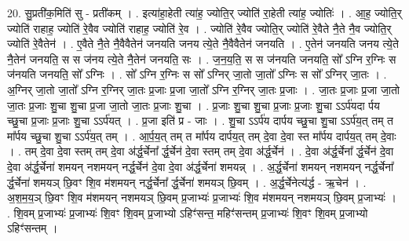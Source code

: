 \documentclass[17pt]{extarticle}
\begin{document}
20. सु॒प्रती॑क॒मिति॑ सु - प्रती॑कम् । . इत्या॑हा॒हेती त्या॑ह॒ ज्योति॒र् ज्योति॑ रा॒हेती त्या॑ह॒ ज्योतिः॑ । . आ॒ह॒ ज्योति॒र् ज्योति॑ राहाह॒ ज्योति॑ रे॒वैव ज्योति॑ राहाह॒ ज्योति॑ रे॒व । . ज्योति॑ रे॒वैव ज्योति॒र् ज्योति॑ रे॒वैते नै॒ते नै॒व ज्योति॒र् ज्योति॑ रे॒वैतेन॑ । . ए॒वैते नै॒ते नै॒वैवैतेन॑ जनयति जनय त्ये॒ते नै॒वैवैतेन॑ जनयति । . ए॒तेन॑ जनयति जनय त्ये॒ते नै॒तेन॑ जनयति॒ स स ज॑नय त्ये॒ते नै॒तेन॑ जनयति॒ सः । . ज॒न॒य॒ति॒ स स ज॑नयति जनयति॒ सो᳚ ऽग्नि र॒ग्निः स ज॑नयति जनयति॒ सो᳚ ऽग्निः । . सो᳚ ऽग्नि र॒ग्निः स सो᳚ ऽग्निर् जा॒तो जा॒तो᳚ ऽग्निः स सो᳚ ऽग्निर् जा॒तः । . अ॒ग्निर् जा॒तो जा॒तो᳚ ऽग्नि र॒ग्निर् जा॒तः प्र॒जाः प्र॒जा जा॒तो᳚ ऽग्नि र॒ग्निर् जा॒तः प्र॒जाः । . जा॒तः प्र॒जाः प्र॒जा जा॒तो जा॒तः प्र॒जाः शु॒चा शु॒चा प्र॒जा जा॒तो जा॒तः प्र॒जाः शु॒चा । . प्र॒जाः शु॒चा शु॒चा प्र॒जाः प्र॒जाः शु॒चा ऽऽर्प॑यदा र्पय च्छु॒चा प्र॒जाः प्र॒जाः शु॒चा ऽऽर्प॑यत् । . प्र॒जा इति॑ प्र - जाः । . शु॒चा ऽऽर्प॑य दार्पय च्छु॒चा शु॒चा ऽऽर्प॑य॒त् तम् त मा᳚र्पय च्छु॒चा शु॒चा ऽऽर्प॑य॒त् तम् । . आ॒र्प॒य॒त् तम् त मा᳚र्पय दार्पय॒त् तम् दे॒वा दे॒वा स्त मा᳚र्पय दार्पय॒त् तम् दे॒वाः । . तम् दे॒वा दे॒वा स्तम् तम् दे॒वा अ॑र्द्ध॒र्चेना᳚ र्द्ध॒र्चेन॑ दे॒वा स्तम् तम् दे॒वा अ॑र्द्ध॒र्चेन॑ । . दे॒वा अ॑र्द्ध॒र्चेना᳚ र्द्ध॒र्चेन॑ दे॒वा दे॒वा अ॑र्द्ध॒र्चेना॑ शमयन् नशमयन् नर्द्ध॒र्चेन॑ दे॒वा दे॒वा अ॑र्द्ध॒र्चेना॑ शमयन्न् । . अ॒र्द्ध॒र्चेना॑ शमयन् नशमयन् नर्द्ध॒र्चेना᳚ र्द्ध॒र्चेना॑ शमयञ् छि॒वꣳ शि॒व म॑शमयन् नर्द्ध॒र्चेना᳚ र्द्ध॒र्चेना॑ शमयञ् छि॒वम् । . अ॒र्द्ध॒र्चेनेत्य॑र्द्ध - ऋ॒चेन॑ । . अ॒श॒म॒य॒ञ् छि॒वꣳ शि॒व म॑शमयन् नशमयञ् छि॒वम् प्र॒जाभ्यः॑ प्र॒जाभ्यः॑ शि॒व म॑शमयन् नशमयञ् छि॒वम् प्र॒जाभ्यः॑ । . शि॒वम् प्र॒जाभ्यः॑ प्र॒जाभ्यः॑ शि॒वꣳ शि॒वम् प्र॒जाभ्यो ऽहिꣳ॑सन्त॒ महिꣳ॑सन्तम् प्र॒जाभ्यः॑ शि॒वꣳ शि॒वम् प्र॒जाभ्यो ऽहिꣳ॑सन्तम् । \newline
\end{document}
